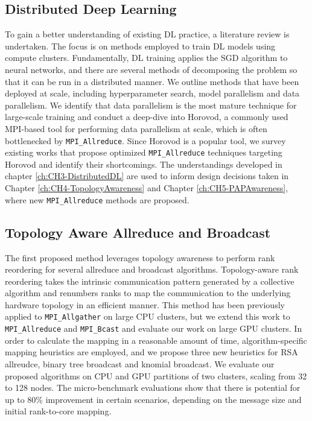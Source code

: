 \subsection{Distributed Deep Learning}
To gain a better understanding of existing \gls{DL} practice, a literature review is undertaken. 
The focus is on methods employed to train \gls{DL} models using compute clusters.
Fundamentally, \gls{DL} training applies the \gls{SGD} algorithm to neural networks, and there are several methods of decomposing the problem so that it can be run in a distributed manner. 
We outline methods that have been deployed at scale, including hyperparameter search, model parallelism and data parallelism.
We identify that data parallelism is the most mature technique for large-scale training and conduct a deep-dive into Horovod, a commonly used \gls{MPI}-based tool for performing data parallelism at scale, which is often bottlenecked by \texttt{MPI\_Allreduce}.
Since Horovod is a popular tool, we survey existing works that propose optimized \texttt{MPI\_Allreduce} techniques targeting Horovod and identify their shortcomings.
The understandings developed in chapter \ref{ch:CH3-DistributedDL} are used to inform design decisions taken in Chapter \ref{ch:CH4-TopologyAwareness} and Chapter \ref{ch:CH5-PAPAwareness}, where new \texttt{MPI\_Allreduce} methods are proposed.

\subsection{Topology Aware Allreduce and Broadcast}
The first proposed method leverages topology awareness to perform rank reordering for several allreduce and broadcast algorithms.
Topology-aware rank reordering takes the intrinsic communication pattern generated by a collective algorithm and renumbers ranks to map the communication to the underlying hardware topology in an efficient manner.
This method has been previously applied to \texttt{MPI\_Allgather} on large \gls{CPU} clusters, but we extend this work to \texttt{MPI\_Allreduce} and \texttt{MPI\_Bcast} and evaluate our work on large \gls{GPU} clusters.
In order to calculate the mapping in a reasonable amount of time, algorithm-specific mapping heuristics are employed, and we propose three new heuristics for \gls{RSA} allreudce, binary tree broadcast and knomial broadcast.
We evaluate our proposed algorithms on \gls{CPU} and \gls{GPU} partitions of two clusters, scaling from 32 to 128 nodes.
The micro-benchmark evaluations show that there is potential for up to 80\% improvement in certain scenarios, depending on the message size and initial rank-to-core mapping.

